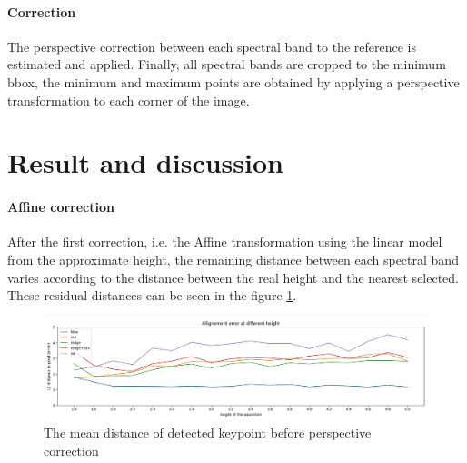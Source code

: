 \documentclass[]{elsarticle}
\begin{document}
	\paragraph{Correction}
	
	The perspective correction between each spectral band to the reference is estimated and applied.
	Finally, all spectral bands are cropped to the minimum bbox,
	the minimum and maximum points are obtained by applying a perspective transformation to each corner of the image.
	
	
	\section{Result and discussion}
	
	\paragraph{Affine correction}
	After the first correction, i.e. the Affine transformation using the linear model from the approximate height,
	the remaining distance between each spectral band varies according to the distance between the real height and the nearest selected.
	These residual distances can be seen in the figure \ref{fig:affine-error}.
	
	\begin{figure}[!htb]
		\centering
		\includegraphics[width=\linewidth]{../figures/affine-allignement-rmse.jpg}
		\caption{The mean distance of detected keypoint before perspective correction}
		\label{fig:affine-error}
	\end{figure}
	
\end{document}
